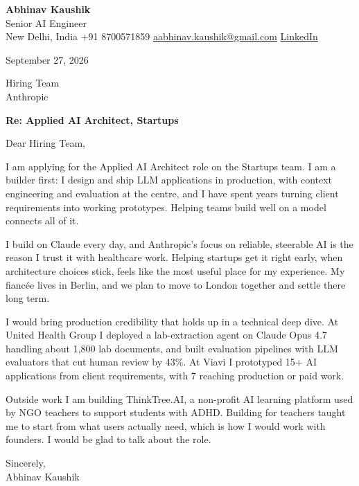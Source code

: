 \documentclass[11pt,a4paper]{article}
\begin{document}
{\Large\bfseries Abhinav Kaushik}\\
Senior AI Engineer\\
New Delhi, India \textbar{} +91 8700571859 \textbar{} \href{mailto:aabhinav.kaushik@gmail.com}{aabhinav.kaushik@gmail.com} \textbar{} \href{https://www.linkedin.com/in/abhinav-kaushik10/}{LinkedIn}  

September 27, 2026

Hiring Team\\
Anthropic

\textbf{Re: Applied AI Architect, Startups}

Dear Hiring Team,

I am applying for the Applied AI Architect role on the Startups team. I am a builder first: I design and ship LLM applications in production, with context engineering and evaluation at the centre, and I have spent years turning client requirements into working prototypes. Helping teams build well on a model connects all of it.

I build on Claude every day, and Anthropic's focus on reliable, steerable AI is the reason I trust it with healthcare work. Helping startups get it right early, when architecture choices stick, feels like the most useful place for my experience. My fiancée lives in Berlin, and we plan to move to London together and settle there long term.

I would bring production credibility that holds up in a technical deep dive. At United Health Group I deployed a lab-extraction agent on Claude Opus 4.7 handling about 1,800 lab documents, and built evaluation pipelines with LLM evaluators that cut human review by 43\%. At Viavi I prototyped 15+ AI applications from client requirements, with 7 reaching production or paid work.

Outside work I am building ThinkTree.AI, a non-profit AI learning platform used by NGO teachers to support students with ADHD. Building for teachers taught me to start from what users actually need, which is how I would work with founders. I would be glad to talk about the role.

Sincerely,\\[4pt]
Abhinav Kaushik
\end{document}
